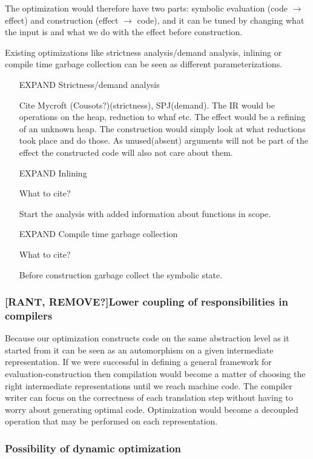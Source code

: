 \documentclass[a4paper]{article}
\begin{document}
The optimization would therefore have two parts: symbolic evaluation (code $\to$ effect) and construction (effect $\to$ code), and it can be tuned by changing what the input is and what we do with the effect before construction.

Existing optimizations like strictness analysis/demand analysis, inlining or compile time garbage collection can be seen as different parameterizations.

\begin{itemize}
\item [EXPAND]Strictness/demand analysis

Cite Mycroft (Cousots?)(strictness), SPJ(demand). The IR would be operations on the heap, reduction to whnf etc. The effect would be a refining of an unknown heap. The construction would simply look at what reductions took place and do those. As unused(absent) arguments will not be part of the effect the constructed code will also not care about them.

\item [EXPAND]Inlining

What to cite?

Start the analysis with added information about functions in scope.

\item [EXPAND]Compile time garbage collection

What to cite?

Before construction garbage collect the symbolic state.

\end{itemize}

\subsubsection*{[RANT, REMOVE?]Lower coupling of responsibilities in compilers}

Because our optimization constructs code on the same abstraction level as it started from it can be seen as an automorphism on a given intermediate representation. If we were successful in defining a general framework for evaluation-construction then compilation would become a matter of choosing the right intermediate representations until we reach machine code. The compiler writer can focus on the correctness of each translation step without having to worry about generating optimal code. Optimization would become a decoupled operation that may be performed on each representation.

\subsubsection*{Possibility of dynamic optimization}
\end{document}
